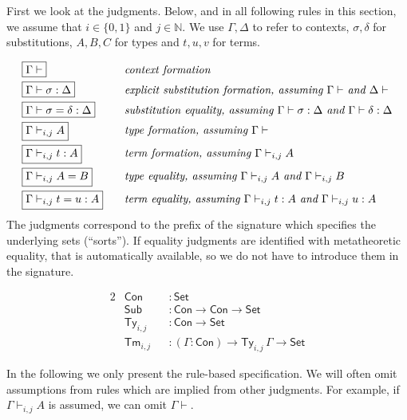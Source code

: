 \documentclass[acmsmall,screen]{acmart}
\newcommand{\msf}[1]{\mathsf{#1}}
\newcommand{\Con}{\msf{Con}}
\newcommand{\Sub}{\msf{Sub}}
\newcommand{\Ty}{\msf{Ty}}
\newcommand{\Tm}{\msf{Tm}}
\newcommand{\Set}{\mathsf{Set}}
\theoremstyle{remark}
\begin{document}
First we look at the judgments. Below, and in all following rules in this
section, we assume that $i \in \{0,1\}$ and $j \in \mathbb{N}$. We use $\Gamma,\Delta$ to
refer to contexts, $\sigma,\delta$ for substitutions, $A,B,C$ for types and $t,u,v$ for terms.

\begin{alignat*}{2}
  & \boxed{\Gamma\vdash}\hspace{6em}           && \text{\emph{context formation}}\\
  & \boxed{\Gamma\vdash \sigma : \Delta}       && \text{\emph{explicit substitution formation, assuming $\Gamma \vdash$ and $\Delta \vdash$}}\\
  & \boxed{\Gamma \vdash \sigma = \delta : \Delta} && \text{\emph{substitution equality, assuming $\Gamma \vdash \sigma : \Delta$ and $\Gamma \vdash \delta : \Delta$}}\\
  & \boxed{\Gamma\vdash_{i,j} A}                && \text{\emph{type formation, assuming $\Gamma\vdash$}}\\
  & \boxed{\Gamma\vdash_{i,j} t : A}            && \text{\emph{term formation, assuming $\Gamma \vdash_{i,j} A$}}\\
  & \boxed{\Gamma \vdash_{i,j} A = B}           && \text{\emph{type equality, assuming $\Gamma \vdash_{i,j} A$ and $\Gamma \vdash_{i,j} B$}}\\
  & \boxed{\Gamma \vdash_{i,j} t = u : A}       && \text{\emph{term equality, assuming $\Gamma \vdash_{i,j} t : A$ and $\Gamma \vdash_{i,j} u : A$}}
\end{alignat*}
\newline
\noindent The judgments correspond to the prefix of the signature which specifies the underlying sets (``sorts''). If equality judgments are identified with metatheoretic equality, that is automatically available, so we do not have to introduce them in the signature.

\begin{alignat*}{2}
  & \Con &&: \Set \\
  & \Sub &&: \Con \to \Con \to \Set \\
  & \Ty_{i,j}  &&: \Con \to \Set \\
  & \Tm_{i,j}  &&: (\Gamma : \Con) \to \Ty_{i,j}\,\Gamma \to \Set
\end{alignat*}

In the following we only present the rule-based specification. We will
often omit assumptions from rules which are implied from other judgments. For
example, if $\Gamma \vdash_{i,j} A$ is assumed, we can omit $\Gamma \vdash$.
\end{document}
